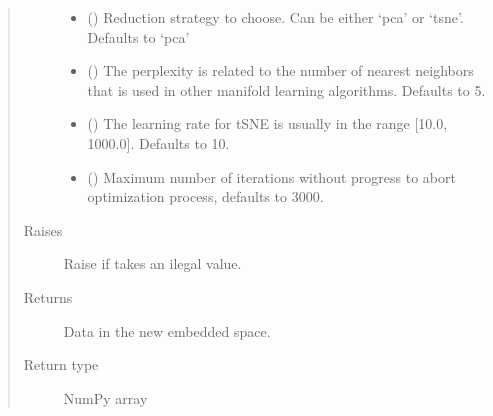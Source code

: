 \documentclass[letterpaper,10pt,english]{sphinxmanual}
\begin{document}
\begin{fulllineitems}
\begin{quote}
\begin{description}
\begin{itemize}
\item {} 
 (\sphinxstyleliteralemphasis{\sphinxupquote{, }}) \textendash{} Reduction strategy to choose. Can be either
‘pca’ or ‘tsne’. Defaults to ‘pca’

\item {} 
 (\sphinxstyleliteralemphasis{\sphinxupquote{, }}) \textendash{} The perplexity is related to the number of
nearest neighbors that is used in other manifold learning algorithms.
Defaults to 5.

\item {} 
 (\sphinxstyleliteralemphasis{\sphinxupquote{, }}) \textendash{} The learning rate for t\sphinxhyphen{}SNE is usually
in the range {[}10.0, 1000.0{]}. Defaults to 10.

\item {} 
 (\sphinxstyleliteralemphasis{\sphinxupquote{, }}) \textendash{} Maximum number of iterations without progress
to abort optimization process, defaults to 3000.

\end{itemize}

\item[{Raises}] \leavevmode
{} \textendash{} Raise  if  takes
an ilegal value.

\item[{Returns}] \leavevmode
Data in the new embedded space.

\item[{Return type}] \leavevmode
NumPy array

\end{description}\end{quote}

\end{fulllineitems}

\end{document}

